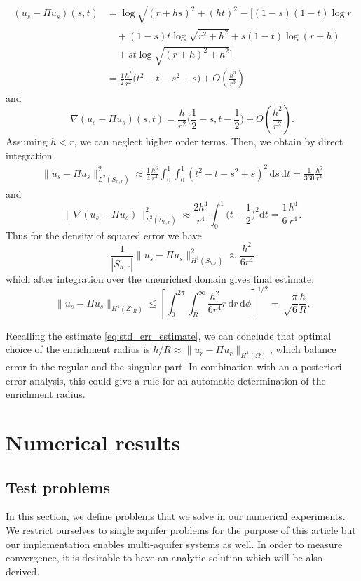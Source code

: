 \documentclass{elsarticle}
\def\abs#1{\left|#1\right|}
\def\d{\mathrm{d}}
\def\norm#1{\| #1 \|}
\def\abs#1{| #1 |}
\begin{document}
\begin{align*}
 (u_s - \Pi u_s)(s,t)&=\log\sqrt{(r+hs)^2+(ht)^2} -\Big[(1-s)(1-t)\log r\\
 &\quad+ (1-s)t\log\sqrt{r^2+h^2} + s(1-t) \log(r+h) \\
 &\quad+ st\log\sqrt{(r+h)^2+h^2} \Big]\\
 &=\frac12 \frac{h^2}{r^2}\big(t^2-t - s^2 +s\big) + O(\frac{h^3}{r^3})
\end{align*}
and 
\begin{equation}
 \nabla(u_s - \Pi u_s)(s,t) = \frac{h}{r^2} \Big( \frac12-s, t-\frac12 \Big) + O(\frac{h^2}{r^2}).
\end{equation}
Assuming $h<r$, we can neglect higher order terms. Then, we obtain by direct integration
\begin{align*}
 \norm{u_s - \Pi u_s}^2_{L^2(S_{h,r})} \approx \frac14 \frac{h^6}{r^4}\int_0^1\int_0^1 (t^2-t-s^2+s)^2\,\d s\, \d t = \frac{1}{360}\frac{h^6}{r^4} 
\end{align*}
and
\begin{equation}
    \label{eq:grad_estimate_on_square}
    \norm{\nabla(u_s - \Pi u_s)}^2_{L^2(S_{h,r})} \approx \frac{2h^4}{r^4} \int_0^1 \Big(t-\frac12\Big)^2 \d t = \frac{1}{6}\frac{h^4}{r^4}.
\end{equation}
Thus for the density of squared error we have
\[
    \frac{1}{\abs{S_{h,r}}} \norm{u_s - \Pi u_s}^2_{H^1(S_{h,r})} \approx \frac{h^2}{6r^4}
\]
which after integration over the unenriched domain gives final estimate:
\begin{equation}
    \label{eq:singular_approx_error}
    \norm{u_s - \Pi u_s}_{H^1(Z'_R)} \le \left[\int_0^{2\pi} \int_R^\infty \frac{h^2} {6r^4} r \,\d r\, \d \phi\right]^{1/2} = \sqrt\frac{\pi}{6}\frac{h}{R}. 
\end{equation}

Recalling the estimate \eqref{eq:std_err_estimate}, we can conclude that optimal choice of the enrichment radius is $h/R\approx \norm{u_r-\Pi u_r}_{H^1(\Omega)}$, 
which balance error in the regular and the singular part. In combination with an a posteriori error analysis, this could give a rule for an automatic
determination of the enrichment radius.



\section{Numerical results}
\label{sec:results}

\subsection{Test problems} \label{sec:test_cases}
In this section, we define problems that we solve in our numerical experiments. We restrict ourselves to 
single aquifer problems for the purpose of this article but our implementation enables multi-aquifer systems 
as well. In order to measure convergence, it is desirable to have an analytic solution which will be also derived. 
\end{document}
